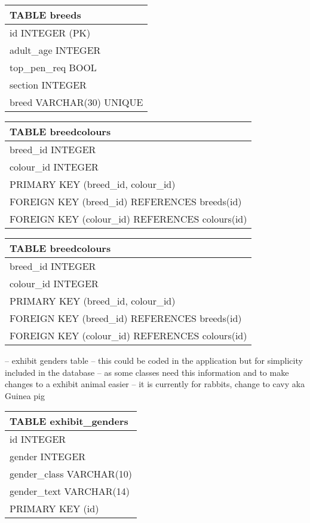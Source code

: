 \documentclass[a4paper,11pt]{report}
\begin{document}
\newline 
\begin{tabular}{| p{15cm} |} \hline
TABLE breeds \\ \hline
id INTEGER (PK) \\ 
adult\_age INTEGER \\
top\_pen\_req BOOL \\ 
section INTEGER \\
breed VARCHAR(30) UNIQUE \\
\hline
\end{tabular}
\newline
\begin{tabular}{|p{15cm}|}  \hline
TABLE breedcolours \\ \hline 
breed\_id INTEGER \\
colour\_id INTEGER \\
PRIMARY KEY (breed\_id, colour\_id) \\
FOREIGN KEY (breed\_id) REFERENCES breeds(id) \\
FOREIGN KEY (colour\_id) REFERENCES colours(id) \\ \hline
\end{tabular}
\newline
\begin{tabular}{|p{15cm}|}  \hline
TABLE breedcolours \\ \hline
breed\_id INTEGER \\
colour\_id INTEGER \\
PRIMARY KEY (breed\_id, colour\_id)\\
FOREIGN KEY (breed\_id) REFERENCES breeds(id) \\
FOREIGN KEY (colour\_id) REFERENCES colours(id) \\ \hline
\end{tabular}

-- exhibit genders table 
-- this could be coded in the application but for simplicity included in the database
-- as some classes need this information and to make changes to a exhibit animal easier
-- it is currently for rabbits, change to cavy aka Guinea pig \newline
\begin{tabular}{|p{15cm}|}  \hline
TABLE exhibit\_genders\\ \hline
id INTEGER\\
gender INTEGER\\
gender\_class VARCHAR(10)\\
gender\_text VARCHAR(14)\\
PRIMARY KEY (id)\\ \hline
\end{tabular}
\end{document}
